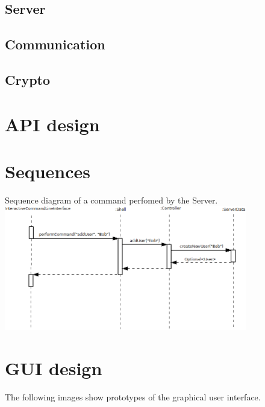 \documentclass[a4paper,10pt]{scrartcl}
\begin{document}
\subsection{Server}
\subsection{Communication}
\subsection{Crypto}


\section{API design}


\section{Sequences}
\begin{illustration}{Sequence diagram of a command perfomed by the Server.}
\includegraphics [width=400px] {figures/sequence_diagramm_server/Server1.png}
\end{illustration}

%

\section{GUI design}
The following images show prototypes of the graphical user interface.
\end{document}
